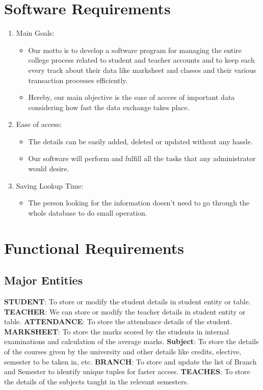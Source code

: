 \section{Software Requirements}
\begin{enumerate}
	\item Main Goals:
		\begin{itemize}
		\item Our motto is to develop a software program for managing the entire college process related to student and teacher accounts and to keep each every track about their data like marksheet and classes and their various transaction processes efficiently.
		\item Hereby, our main objective is the ease of accces of important data considering how fast the data exchange takes place.
		\end{itemize}
	\item Ease of access:
		\begin{itemize}
		\item The details can be easily added, deleted or updated without any hassle.
		\item Our software will perform and fulfill all the tasks that any administrator would desire.
		\end{itemize}		
	\item Saving Lookup Time:
		\begin{itemize}
		\item The person looking for the information doesn't need to go through the whole database to do small operation.
		\end{itemize}
	\end{enumerate}

\pagebreak
\section{Functional Requirements}
\subsection{Major Entities}
\textbf{STUDENT}: To store or modify the student details in student entity or table.
\textbf{TEACHER}: We can store or modify the teacher details in student entity or table.
\textbf{ATTENDANCE}: To store the attendance details of the student.
\textbf{MARKSHEET}: To store the marks scored by the students in internal examinations and calculation of the average marks.
\textbf{Subject}: To store the details of the courses given by the university and other details like credits, elective, semester to be taken in, etc.
\textbf{BRANCH}: To store and update the list of Branch and Semester to identify unique tuples for faster access.
\textbf{TEACHES}: To store the details of the subjects taught in the relevant semesters.



